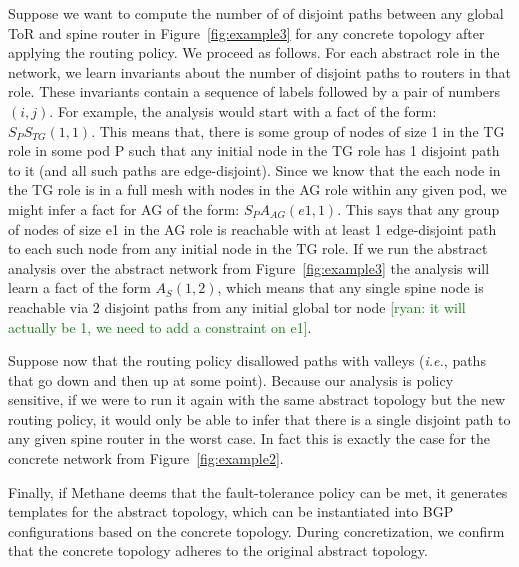\documentclass[numbers, 10pt, preprint]{sigplanconf}
\newcommand{\ryan}[1]{\textcolor{green}{[ryan: #1]}}
\newcommand{\IE}{\emph{i.e.}}
\newcommand{\sysname}{{\small \sf Methane}\xspace}
\newcommand{\CD}[1]{\texttt{\small #1}}  %
\newcommand{\KW}[1]{\texttt{\small\bfseries{#1}}}
\newcommand{\True}{\CD{true}}
\newcommand{\Define}{\KW{define}}
\newcommand{\Path}{\texttt{=>}}
\newcommand{\Novalley}{\KW{novalley}}
\begin{document}
Suppose we want to compute the number of of disjoint paths between any global ToR and spine router in Figure~\ref{fig:example3} for any concrete topology after applying the routing policy.
We proceed as follows. For each abstract role in the network, we learn invariants about the number of disjoint paths to routers in that role. These invariants contain a sequence of labels followed by a pair of numbers $(i,j)$. For example, the analysis would start with a fact of the form: $S_P S_{TG} (1,1)$. This means that, there is some group of nodes of size 1 in the TG role in some pod P such that any initial node in the TG role has 1 disjoint path to it (and all such paths are edge-disjoint). Since we know that the each node in the TG role is in a full mesh with nodes in the AG role within any given pod, we might infer a fact for AG of the form: $S_P A_{AG}(e1,1)$. This says that any group of nodes of size e1 in the AG role is reachable with at least 1 edge-disjoint path to each such node from any initial node in the TG role.
%
If we run the abstract analysis over the abstract network from Figure~\ref{fig:example3} the analysis will learn a fact of the form $A_{S}(1,2)$, which means that any single spine node is reachable via 2 disjoint paths from any initial global tor node \ryan{it will actually be 1, we need to add a constraint on e1}.

Suppose now that the routing policy disallowed paths with valleys (\IE, paths that go down and then up at some point).
Because our analysis is policy sensitive, if we were to run it again with the same abstract topology but the new routing policy, it would only be able to infer that there is a single disjoint path to any given spine router in the worst case.
In fact this is exactly the case for the concrete network from Figure~\ref{fig:example2}.

Finally, if \sysname deems that the fault-tolerance policy can be met, it generates templates for the abstract topology, which can be instantiated into BGP configurations based on the concrete topology. During concretization, we confirm that the concrete topology adheres to the original abstract topology.
\end{document}
